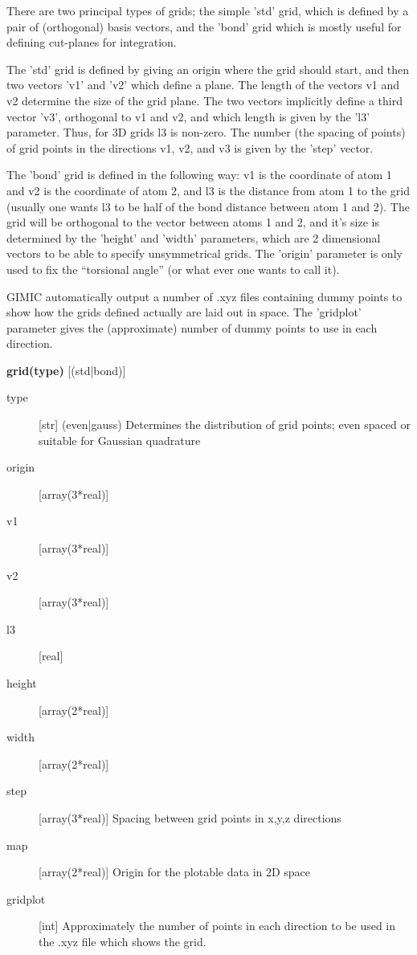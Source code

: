 \documentclass[a4paper,11pt]{article}
\begin{document}
There are two principal types of grids; the simple 'std' grid, which is
defined by a pair of (orthogonal) basis vectors, and the 'bond' grid which is
mostly useful for defining cut-planes for integration.

The 'std' grid is defined by giving an origin where the grid should start,
and then two vectors 'v1' and 'v2' which define a plane. The length of the
vectors v1 and v2 determine the size of the grid plane. The two vectors
implicitly define a third vector 'v3', orthogonal to v1 and v2, and which
length is given by the 'l3' parameter. Thus, for 3D grids l3 is non-zero.
The number (the spacing of points) of grid points in the directions v1, v2, 
and v3 is given by the 'step' vector.

The 'bond' grid is defined in the following way: v1 is the coordinate of atom
1 and v2 is the coordinate of atom 2, and l3 is the distance from atom 1 to
the grid (usually one wants l3 to be half of the bond distance between atom 1
and 2). The grid will be orthogonal to the vector between atoms 1 and 2, and
it's size is determined by the 'height' and 'width' parameters, which are 2
dimensional vectors to be able to specify unsymmetrical grids. The 'origin'
parameter is only used to fix the ``torsional angle'' (or what ever one wants
to call it).

GIMIC automatically output a number of .xyz files containing dummy points to
show how the grids defined actually are laid out in space. The 'gridplot' 
parameter gives the (approximate) number of dummy points to use in each
direction.

\textbf{grid(type)} [(std|bond)]
\begin{description}
  \item[type] [str] (even|gauss) Determines the distribution of grid points;
	even spaced or suitable for Gaussian quadrature
  \item[origin] [array(3*real)]
  \item[v1] [array(3*real)]	
  \item[v2] [array(3*real)]	
  \item[l3] [real]
  \item[height] [array(2*real)]
  \item[width] [array(2*real)]
  \item[step] [array(3*real)] Spacing between grid points in x,y,z directions 
  \item[map] [array(2*real)] Origin for the plotable data in 2D space
  \item[gridplot] [int] Approximately the number of points in each direction to
	be used in the .xyz file which shows the grid.
\end{description}
\end{document}

